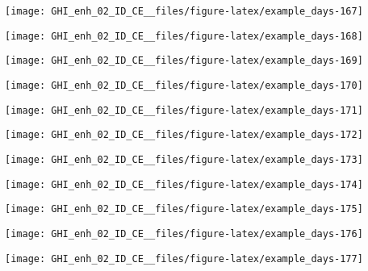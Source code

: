 \documentclass[
  10pt,
  a4paper,oneside]{article}
\begin{document}
\begin{center}\texttt{[image: GHI\_enh\_02\_ID\_CE\_\_files/figure-latex/example\_days-167]} \end{center}

\begin{center}\texttt{[image: GHI\_enh\_02\_ID\_CE\_\_files/figure-latex/example\_days-168]} \end{center}

\begin{center}\texttt{[image: GHI\_enh\_02\_ID\_CE\_\_files/figure-latex/example\_days-169]} \end{center}

\begin{center}\texttt{[image: GHI\_enh\_02\_ID\_CE\_\_files/figure-latex/example\_days-170]} \end{center}

\begin{center}\texttt{[image: GHI\_enh\_02\_ID\_CE\_\_files/figure-latex/example\_days-171]} \end{center}

\begin{center}\texttt{[image: GHI\_enh\_02\_ID\_CE\_\_files/figure-latex/example\_days-172]} \end{center}

\begin{center}\texttt{[image: GHI\_enh\_02\_ID\_CE\_\_files/figure-latex/example\_days-173]} \end{center}

\begin{center}\texttt{[image: GHI\_enh\_02\_ID\_CE\_\_files/figure-latex/example\_days-174]} \end{center}

\begin{center}\texttt{[image: GHI\_enh\_02\_ID\_CE\_\_files/figure-latex/example\_days-175]} \end{center}

\begin{center}\texttt{[image: GHI\_enh\_02\_ID\_CE\_\_files/figure-latex/example\_days-176]} \end{center}

\begin{center}\texttt{[image: GHI\_enh\_02\_ID\_CE\_\_files/figure-latex/example\_days-177]} \end{center}
\end{document}
